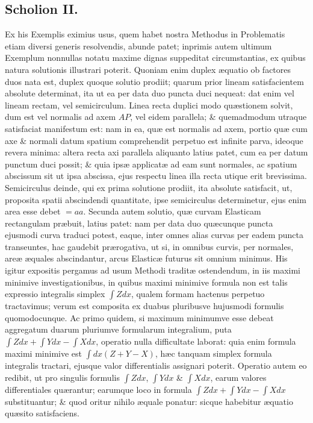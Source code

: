\subsection*{Scholion II.}
Ex his Exemplis eximius usus, quem habet nostra Methodus in Problematis etiam diversi generis resolvendis, abunde patet; inprimis autem ultimum Exemplum nonnullas notatu maxime dignas suppeditat circumstantias, ex quibus natura solutionis illustrari poterit. Quoniam enim duplex æquatio ob factores duos nata est, duplex quoque solutio prodiit; quarum prior lineam satisfacientem absolute determinat, ita ut ea per data duo puncta duci nequeat: dat enim vel lineam rectam, vel semicirculum. Linea recta duplici modo quæstionem solvit, dum est vel normalis ad axem $AP$, vel eidem parallela; \& quemadmodum utraque satisfaciat manifestum est: nam in ea, quæ est normalis ad axem, portio quæ cum axe \& normali datum spatium comprehendit perpetuo est infinite parva, ideoque revera minima: altera recta axi parallela aliquanto latius patet, cum ea per datum punctum duci possit; \& quia ipsæ applicatæ ad eam sunt normales, ac spatium abscissum sit ut ipsa abscissa, ejus respectu linea illa recta utique erit brevissima. Semicirculus deinde, qui ex prima solutione prodiit, ita absolute satisfacit, ut, proposita spatii abscindendi quantitate, ipse semicirculus determinetur,
ejus enim area esse debet $=aa$. Secunda autem solutio, quæ curvam Elasticam rectangulam præbuit, latius patet: nam per data duo quæcunque puncta ejusmodi curva traduci potest, eaque, inter omnes alias curvas per eadem puncta transeuntes, hac gaudebit prærogativa, ut si, in omnibus curvis, per normales, areæ æquales abscindantur, arcus Elasticæ futurus sit omnium minimus. His igitur expositis pergamus ad usum Methodi traditæ ostendendum, in iis maximi minimive investigationibus, in quibus maximi minimive formula non est talis expressio integralis simplex $\int Zdx$, qualem formam hactenus perpetuo tractavimus; verum est composita ex duabus pluribusve hujusmodi formulis quomodocunque. Ac primo quidem, si maximum minimumve esse debeat aggregatum duarum pluriumve formularum integralium, puta $\int Zdx+\int Ydx-\int Xdx$, operatio nulla difficultate laborat: quia enim formula maximi minimive est $\int dx(Z+Y-X)$, hæc tanquam simplex formula integralis tractari, ejusque valor differentialis assignari poterit. Operatio autem eo redibit, ut pro singulis formulis $\int Zdx$, $\int Ydx$ \& $\int Xdx$, earum valores differentiales quærantur; earumque loco in formula $\int Zdx+\int Ydx-\int Xdx$ substituantur; \& quod oritur nihilo æquale ponatur: sicque habebitur æquatio quæsito satisfaciens.
